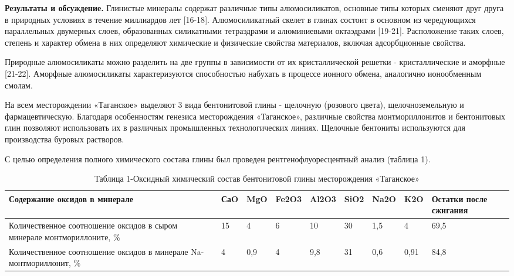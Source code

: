 \begin{multicols}{2}
{\bfseries Результаты и обсуждение.} Глинистые минералы содержат различные
типы алюмосиликатов, основные типы которых сменяют друг друга в
природных условиях в течение миллиардов лет {[}16-18{]}. Алюмосиликатный
скелет в глинах состоит в основном из чередующихся параллельных
двумерных слоев, образованных силикатными тетраэдрами и алюминиевыми
октаэдрами {[}19-21{]}. Расположение таких слоев, степень и характер
обмена в них определяют химические и физические свойства материалов,
включая адсорбционные свойства.

Природные алюмосиликаты можно разделить на две группы в зависимости от
их кристаллической решетки - кристаллические и аморфные {[}21-22{]}.
Аморфные алюмосиликаты характеризуются способностью набухать в процессе
ионного обмена, аналогично ионообменным смолам.

На всем месторождении «Таганское» выделяют 3 вида бентонитовой глины -
щелочную (розового цвета), щелочноземельную и фармацевтическую.
Благодаря особенностям генезиса месторождения «Таганское», различные
свойства монтмориллонитов и бентонитовых глин позволяют использовать их
в различных промышленных технологических линиях. Щелочные бентониты
используются для производства буровых растворов.

С целью определения полного химического состава глины был проведен
рентгенофлуоресцентный анализ (таблица 1).
\end{multicols}


\begin{table}[H]
\caption*{Таблица 1-Оксидный химический состав бентонитовой глины месторождения «Таганское»}
\centering
\begin{tabular}{|p{}|l|l|l|l|l|l|l|p{}|}
\hline
\textbf{Содержание оксидов в минерале} & \textbf{СаO} & \textbf{MgO} & \textbf{Fe2O3} & \textbf{Al2O3} & \textbf{SiO2} & \textbf{Na2O} & \textbf{K2O} & \textbf{Остатки после сжигания} \\ \hline
Количественное соотношение оксидов в сыром минерале монтмориллоните, \% & 15 & 4 & 6 & 10 & 30 & 1,5 & 4 & 69,5 \\ \hline
Количественное соотношение оксидов в минерале Na-монтмориллонит, \% & 4 & 0,9 & 4 & 9,8 & 31 & 0,6 & 0,91 & 84,8 \\ \hline
\end{tabular}
\end{table}

